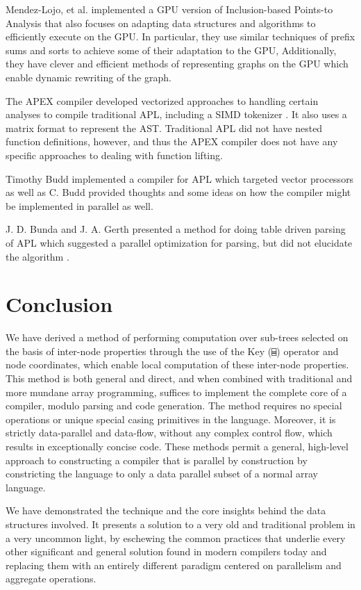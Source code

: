 ﻿\documentclass[numbers,10pt,preprint]{sigplanconf}
\begin{document}
Mendez-Lojo, et al. implemented a GPU version of Inclusion-based Points-to Analysis \cite{mendez2012inclusion} that also focuses on adapting data structures and algorithms to efficiently execute on the GPU. In particular, they use similar techniques of prefix sums and sorts to achieve some of their adaptation to the GPU, Additionally, they have clever and efficient methods of representing graphs on the GPU which enable dynamic rewriting of the graph.

The APEX compiler \cite{bernecky1997apex} developed vectorized approaches to handling certain analyses to compile traditional APL, including a SIMD tokenizer \cite{bernecky2003tokenizer}. It also uses a matrix format to represent the AST. Traditional APL did not have nested function definitions, however, and thus the APEX compiler does not have any specific approaches to dealing with function lifting.

Timothy Budd implemented a compiler \cite{budd1984apl,budd2012apl} for APL which targeted vector processors as well as C. Budd provided thoughts and some ideas on how the compiler might be implemented in parallel as well.

J. D. Bunda and J. A. Gerth presented a method for doing table driven parsing of APL which suggested a parallel optimization for parsing, but did not elucidate the algorithm \cite{bunda1984apl}.

\section{Conclusion}

We have derived a method of performing computation over sub-trees selected on the basis of inter-node properties through the use of the Key (\verb;⌸;) operator and node coordinates, which enable local computation of these inter-node properties. This method is both general and direct, and when combined with traditional and more mundane array programming, suffices to implement the complete core of a compiler, modulo parsing and code generation. The method requires no special operations or unique special casing primitives in the language. Moreover, it is strictly data-parallel and data-flow, without any complex control flow, which results in exceptionally concise code. These methods permit a general, high-level approach to constructing a compiler that is parallel by construction by constricting the language to only a data parallel subset of a normal array language.

We have demonstrated the technique and the core insights behind the data structures involved. It presents a solution to a very old and traditional problem in a very uncommon light, by eschewing the common practices that underlie every other significant and general solution found in modern compilers today and replacing them with an entirely different paradigm centered on parallelism and aggregate operations. 
\balancecolumns
\end{document}
